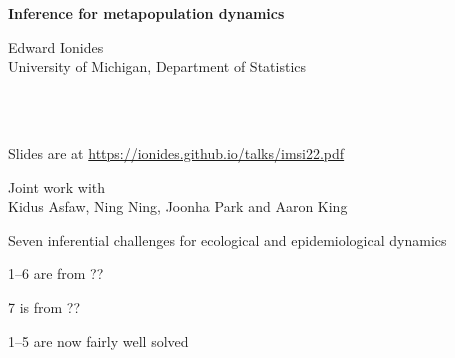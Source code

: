 \documentclass{beamer}
\begin{document}
\begin{frame}
\begin{center}
  {\Large\bf Inference for metapopulation dynamics}



\vspace{2mm}

Edward Ionides\\
University of Michigan, Department of Statistics

\vspace{8mm}

\\
\\

\hspace{3mm}

Slides are at \url{https://ionides.github.io/talks/imsi22.pdf}

\vspace{8mm}

Joint work with\\
Kidus Asfaw, Ning Ning, Joonha Park and Aaron King\\

\end{center}

\end{frame}


\newcommand\challengeSep{\vspace{3mm}}

\begin{frame}{Seven inferential challenges for ecological and epidemiological dynamics}

  \bi
\item 1--6 are from ??
\item 7 is from ??
  \item 1--5 are now fairly well solved
  
\end{frame}
\end{document}
